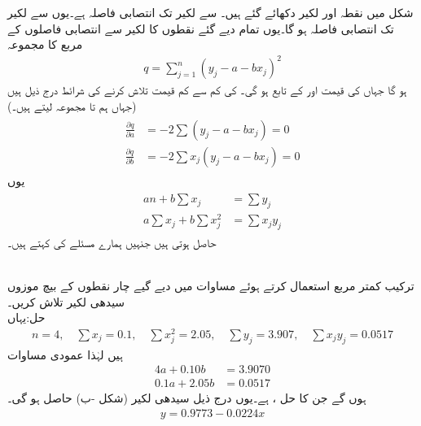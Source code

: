 شکل  میں نقطہ  اور لکیر  دکھائے گئے ہیں۔ سے لکیر تک انتصابی فاصلہ  ہے۔یوں  سے لکیر تک انتصابی فاصلہ  ہو گا۔یوں تمام دیے گئے نقطوں کا لکیر سے انتصابی فاصلوں کے مربع کا مجموعہ
\begin{align*}
q=\sum_{j=1}^{n} (y_j-a-bx_j)^2
\end{align*}
ہو گا جہاں  کی قیمت  اور  کے تابع ہو گی۔ کی کم سے کم قیمت تلاش کرنے کی شرائط درج ذیل ہیں (جہاں ہم  تا  مجموعہ لیتے ہیں۔)
\begin{gather}
\begin{aligned}\label{مساوات_خطی_اعدادی_کمتر_مربع_شرائط_ب}
\frac{\partial q}{\partial a}&=-2\sum(y_j-a-bx_j)=0\\
\frac{\partial q}{\partial b}&=-2\sum x_j(y_j-a-bx_j)=0
\end{aligned} 
\end{gather}
یوں 
\begin{gather}
\begin{aligned}\label{مساوات_خطی_اعدادی_کمتر_مربع_شرائط_پ}
an+b\sum x_j&=\sum y_j\\
a\sum x_j+b\sum x_j^2&=\sum x_jy_j
\end{aligned}
\end{gather}
حاصل ہوتی ہیں جنہیں ہمارے مسئلے کی  کہتے ہیں۔

\quad {}\\
ترکیب کمتر مربع استعمال کرتے ہوئے  مساوات  میں دیے گیے چار نقطوں کے بیچ موزوں سیدھی لکیر تلاش کریں۔\\
حل:\quad یہاں
\begin{align*}
n=4,\quad \sum x_j=0.1,\quad \sum x_j^2=2.05,\quad \sum y_j=3.907, \quad \sum x_jy_j=0.0517
\end{align*}  
ہیں لہٰذا عمودی مساوات
\begin{align*}
4a+0.10b&=3.9070\\
0.1a+2.05b&=0.0517
\end{align*}
ہوں گے جن کا حل ،  ہے۔یوں درج ذیل سیدھی لکیر (شکل -ب) حاصل ہو گی۔
\begin{align*}
y=0.9773-0.0224x
\end{align*}

